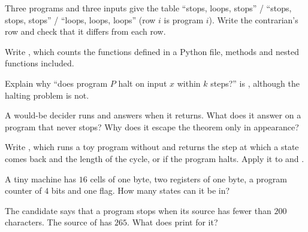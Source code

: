 \begin{exercise}[$\star$]\label{exo:g12:halting-problem:4}
Three programs and three inputs give the table ``stops, loops, stops'' / ``stops, stops, stops'' / ``loops, loops,
loops'' (row $i$ is program $i$). Write the contrarian's row and check that it differs from each row.
\end{exercise}

\begin{exercise}[$\star$]\label{exo:g12:halting-problem:5}
Write , which counts the functions defined in a Python file, methods and nested functions
included.
\end{exercise}

\begin{exercise}[$\star\star$]\label{exo:g12:halting-problem:6}
Explain why ``does program $P$ halt on input $x$ within $k$ steps?'' is , although the halting problem is
not.
\end{exercise}

\begin{exercise}[$\star\star$]\label{exo:g12:halting-problem:7}
A would-be decider runs  and answers  when it returns. What does it answer on a program
that never stops? Why does it escape the theorem only in appearance?
\end{exercise}

\begin{exercise}[$\star\star$]\label{exo:g12:halting-problem:8}
Write , which runs a toy program without  and returns the step at which a state
comes back and the length of the cycle, or  if the program halts. Apply it to  and
.
\end{exercise}

\begin{exercise}[$\star\star$]\label{exo:g12:halting-problem:9}
A tiny machine has $16$ cells of one byte, two registers of one byte, a program counter of $4$ bits and one flag. How
many states can it be in?
\end{exercise}

\begin{exercise}[$\star\star$]\label{exo:g12:halting-problem:10}
The candidate  says that a program stops when its source has fewer than $200$ characters. The
source of  has $265$. What does  print for it?
\end{exercise}

